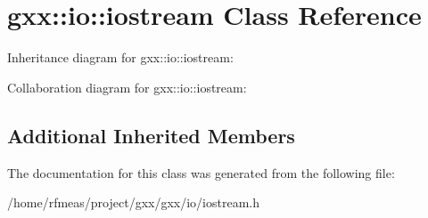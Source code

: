 \hypertarget{classgxx_1_1io_1_1iostream}{}\section{gxx\+:\+:io\+:\+:iostream Class Reference}
\label{classgxx_1_1io_1_1iostream}


Inheritance diagram for gxx\+:\+:io\+:\+:iostream\+:


Collaboration diagram for gxx\+:\+:io\+:\+:iostream\+:
\subsection*{Additional Inherited Members}


The documentation for this class was generated from the following file\+:\begin{DoxyCompactItemize}
\item 
/home/rfmeas/project/gxx/gxx/io/iostream.\+h\end{DoxyCompactItemize}
